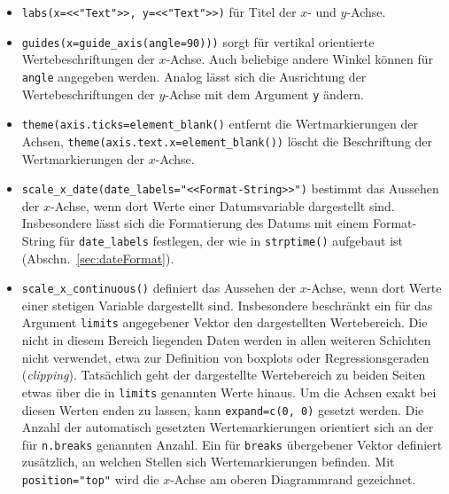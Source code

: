 \begin{itemize}
\item {} \lstinline!labs(x=<<"Text">>, y=<<"Text">>)! für Titel der $x$- und $y$-Achse.
\item \lstinline!guides(x=guide_axis(angle=90)))! sorgt für vertikal orientierte Wertebeschriftungen der $x$-Achse. Auch beliebige andere Winkel können für \lstinline!angle! angegeben werden. Analog lässt sich die Ausrichtung der Wertebeschriftungen der $y$-Achse mit dem Argument \lstinline!y! ändern.
\item \lstinline!theme(axis.ticks=element_blank()! entfernt die Wertmarkierungen der Achsen, \lstinline!theme(axis.text.x=element_blank())! löscht die Beschriftung der Wertmarkierungen der $x$-Achse.
\item {} \lstinline!scale_x_date(date_labels="<<Format-String>>")! bestimmt das Aussehen der $x$-Achse, wenn dort Werte einer Datumsvariable dargestellt sind. Insbesondere lässt sich die Formatierung des Datums mit einem Format-String für \lstinline!date_labels! festlegen, der wie in \lstinline!strptime()! aufgebaut ist (Abschn.\ \ref{sec:dateFormat}).
\item {} \lstinline!scale_x_continuous()! definiert das Aussehen der $x$-Achse, wenn dort Werte einer stetigen Variable dargestellt sind. Insbesondere beschränkt ein für das Argument \lstinline!limits! angegebener Vektor den dargestellten Wertebereich. Die nicht in diesem Bereich liegenden Daten werden in allen weiteren Schichten nicht verwendet, etwa zur Definition von boxplots oder Regressionsgeraden (\emph{clipping}). Tatsächlich geht der dargestellte Wertebereich zu beiden Seiten etwas über die in \lstinline!limits! genannten Werte hinaus. Um die Achsen exakt bei diesen Werten enden zu lassen, kann \lstinline!expand=c(0, 0)! gesetzt werden. Die Anzahl der automatisch gesetzten Wertemarkierungen orientiert sich an der für \lstinline!n.breaks! genannten Anzahl. Ein für \lstinline!breaks! übergebener Vektor definiert zusätzlich, an welchen Stellen sich Wertemarkierungen befinden. Mit \lstinline!position="top"! wird die $x$-Achse am oberen Diagrammrand gezeichnet.

\end{itemize}
